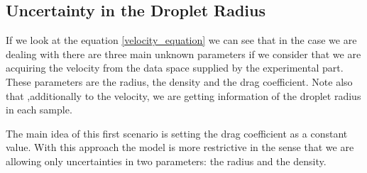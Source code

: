 \documentclass{article}
\begin{document}
\renewcommand{\figurename}{\textbf{Figure}} 
\renewcommand\thefigure{\textbf{\arabic{figure}}} 




\subsection{Uncertainty in the Droplet Radius}

If we look at the equation \ref{velocity_equation} we can see that in the case we are dealing with there are three main unknown parameters if we consider that we are acquiring the velocity from the data space supplied by the experimental part. These parameters are the radius, the density and the drag coefficient. Note also that ,additionally to the velocity, we are getting information of the droplet radius in each sample.
\par \noindent
The main idea of this first scenario  is setting the drag coefficient as a constant value. With this approach the  model is more restrictive in the sense that we are allowing  only uncertainties in two parameters: the radius and the density.
\par \noindent
\end{document}

